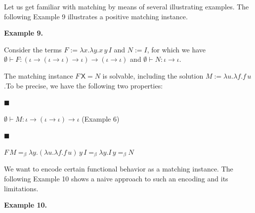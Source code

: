 \documentclass[10pt,a4paper]{amsart}
\begin{document}
Let us get familiar with matching by means of several illustrating examples. The following Example 9 illustrates a positive matching instance.\par
 
 
 
\par\medskip\noindent\textbf{Example 9.}\par
 
 
Consider the terms $F:=\lambda x.\lambda y.x\,y\,I$ and $N:=I$, for which we have $\emptyset\vdash F:(\iota\to(\iota\to\iota)\to\iota)\to(\iota\to\iota)$ and $\emptyset\vdash N:\iota\to\iota$.\par
 
 
 
The matching instance ${F}\,\mathsf{X}=N$ is solvable, including the solution $M:=\lambda u.\lambda f.f\,u$.To be precise, we have the following two properties:\par
  
\par\noindent  $\blacksquare$ 
 
$\emptyset\vdash M:\iota\to(\iota\to\iota)\to\iota$ (Example 6)\par
 
 
 
\par\noindent  $\blacksquare$ 
 
$F\,M=_{\beta}\lambda y.(\lambda u.\lambda f.f\,u)\,y\,I=_{\beta}\lambda y.I\,y%
=_{\beta}N$\par
 
 
  
 
 
 
We want to encode certain functional behavior as a matching instance. The following Example 10 shows a naive approach to such an encoding and its limitations.\par
 
 
 
\par\medskip\noindent\textbf{Example 10.}\par
 
\end{document}
